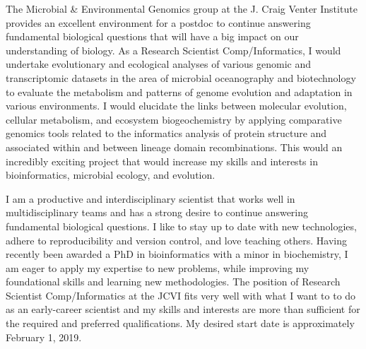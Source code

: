 \documentclass[11pt, letterpaper]{CV_latex_class}
\begin{document}
\begin{cvletter}

\hspace{1em} The Microbial \& Environmental Genomics group at the J. Craig Venter Institute provides an excellent environment for a postdoc to continue answering fundamental biological questions that will have a big impact on our understanding of biology. As a Research Scientist Comp/Informatics, I would undertake evolutionary and ecological analyses of various genomic and transcriptomic datasets in the area of microbial oceanography and biotechnology to evaluate the metabolism and patterns of genome evolution and adaptation in various environments. I would elucidate the links between molecular evolution, cellular metabolism, and ecosystem biogeochemistry by applying comparative genomics tools related to the informatics analysis of protein structure and associated within and between lineage domain recombinations. This would an incredibly exciting project that would increase my skills and interests in bioinformatics, microbial ecology, and evolution.


\hspace{1em} I am a productive and interdisciplinary scientist that works well in multidisciplinary teams and has a strong desire to continue answering fundamental biological questions. I like to stay up to date with new technologies, adhere to reproducibility and version control, and love teaching others. Having recently been awarded a PhD in bioinformatics with a minor in biochemistry, I am eager to apply my expertise to new problems, while improving my foundational skills and learning new methodologies. The position of Research Scientist Comp/Informatics at the JCVI fits very well with what I want to to do as an early-career scientist and my skills and interests are more than sufficient for the required and preferred qualifications. My desired start date is approximately February 1, 2019.

\end{cvletter}


\makeletterclosing

\end{document}

